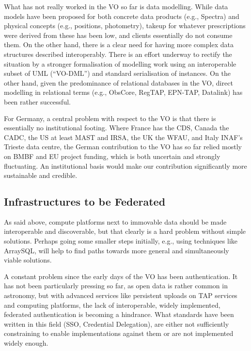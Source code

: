 What has not really worked in the VO so far is data modelling.  While
data models have been proposed for both concrete data products (e.g.,
Spectra) and physical concepts (e.g., positions, photometry), takeup for
whatever prescriptions were derived from these has been low, and clients
essentially do not consume them.  On the other hand, there is a clear
need for having more complex data structures described interoperably.
There is an effort underway to rectify the situation by a stronger
formalisation of modelling work using an interoperable subset of UML
(``VO-DML'') and standard serialisation of instances.  On the other
hand, given the predominance of relational databases in the VO, direct
modelling in relational terms (e.g., ObsCore, RegTAP, EPN-TAP, Datalink)
has been rather successful.

For Germany, a central problem with respect to the VO is that there is
essentially no institutional footing.  Where France has the CDS, Canada
the CADC, the US at least MAST and IRSA, the UK the WFAU, and Italy
INAF's Trieste data centre, the German contribution to the VO has so far
relied mostly on BMBF and EU project funding, which is both uncertain
and strongly fluctuating.  An institutional basis would make our
contribution significantly more sustainable and credible.


\subsection{Infrastructures to be Federated}

As said above, compute platforms next to immovable data should be made
interoperable and discoverable, but that clearly is a hard problem without
simple solutions.  Perhaps going some smaller steps initially, e.g.,
using techniques like ArraySQL, will help to find paths towards more
general and simultaneously viable solutions.

A constant problem since the early days of the VO has been
authentication.  It has not been particularly pressing so far, as open
data is rather common in astronomy, but with advanced services like
persistent uploads on TAP services and computing platforms,
the lack of interoperable, widely implemented, federated authentication
is becoming a hindrance.  What standards have been written in this field
(SSO, Credential Delegation), are either not sufficiently constraining
to enable implementations against them or are not implemented widely
enough.

